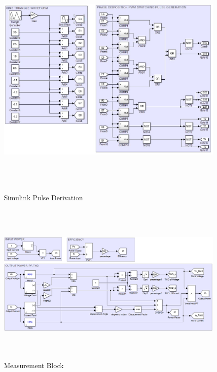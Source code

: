 \documentclass[12pt,a4paper]{report}
\begin{document}
\begin{figure}[H]
	\begin{center}
		\includegraphics[width=15cm,height=12cm]{figures/PD_PWM.jpg}
	\end{center}
	\caption{Simulink Pulse Derivation}
	\label{PD_PWM}	
\end{figure}

\begin{figure}[H]
	\begin{center}
		\includegraphics[width=15cm,height=8cm]{figures/Measurement.png}
	\end{center}
	\caption{Measurement Block}
	\label{measure}	
\end{figure}
\end{document}
